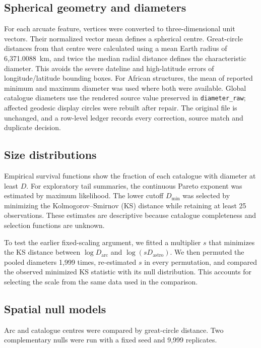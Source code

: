 \documentclass[11pt]{article}
\begin{document}
\subsection{Spherical geometry and diameters}
For each arcuate feature, vertices were converted to three-dimensional unit vectors. Their normalized vector mean defines a spherical centre. Great-circle distances from that centre were calculated using a mean Earth radius of 6,371.0088~km, and twice the median radial distance defines the characteristic diameter. This avoids the severe dateline and high-latitude errors of longitude/latitude bounding boxes. For African structures, the mean of reported minimum and maximum diameter was used where both were available. Global catalogue diameters use the rendered source value preserved in \texttt{diameter\_raw}; affected geodesic display circles were rebuilt after repair. The original file is unchanged, and a row-level ledger records every correction, source match and duplicate decision.

\subsection{Size distributions}
Empirical survival functions show the fraction of each catalogue with diameter at least $D$. For exploratory tail summaries, the continuous Pareto exponent was estimated by maximum likelihood. The lower cutoff $D_{\min}$ was selected by minimizing the Kolmogorov--Smirnov (KS) distance while retaining at least 25 observations. These estimates are descriptive because catalogue completeness and selection functions are unknown.

To test the earlier fixed-scaling argument, we fitted a multiplier $s$ that minimizes the KS distance between $\log D_{\mathrm{arc}}$ and $\log(sD_{\mathrm{astro}})$. We then permuted the pooled diameters 1,999 times, re-estimated $s$ in every permutation, and compared the observed minimized KS statistic with its null distribution. This accounts for selecting the scale from the same data used in the comparison.

\subsection{Spatial null models}
Arc and catalogue centres were compared by great-circle distance. Two complementary nulls were run with a fixed seed and 9,999 replicates.
\end{document}
